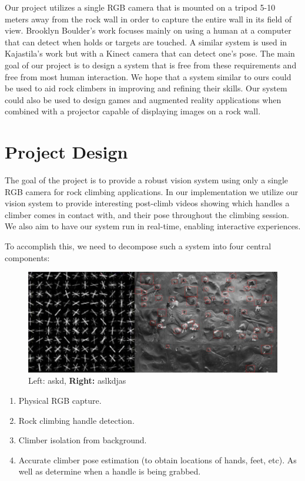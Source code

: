 \documentclass{chi2009}
\begin{document}
Our project utilizes a single RGB camera that is mounted on a tripod 5-10 meters away from the rock wall in order to capture the entire wall in its field of view. Brooklyn Boulder's work focuses mainly on using a human at a computer that can detect when holds or targets are touched. A similar system is used in Kajastila's work but with a Kinect camera that can detect one's pose. The main goal of our project is to design a system that is free from these requirements and free from most human interaction. We hope that a system similar to ours could be used to aid rock climbers in improving and refining their skills. Our system could also be used to design games and augmented reality applications when combined with a projector capable of displaying images on a rock wall.

\section{Project Design}

The goal of the project is to provide a robust vision system using only a single RGB camera for rock climbing applications. In our implementation we utilize our vision system to provide interesting post-climb videos showing which handles a climber comes in contact with, and their pose throughout the climbing session. We also aim to have our system run in real-time, enabling interactive experiences.

To accomplish this, we need to decompose such a system into four central components:

\begin{figure}[t]
  \centering
  \includegraphics[keepaspectratio, width=\textwidth]{figs/svm_wall.jpeg}
  \caption{Left: \normalfont askd, \textbf{Right:} aslkdjas}
  \label{fig:user}
\end{figure}

\begin{enumerate}
  \itemsep0em
  \item Physical RGB capture.
  \item Rock climbing handle detection.
  \item Climber isolation from background.
  \item Accurate climber pose estimation (to obtain locations of hands, feet, etc). As well as determine when a handle is being grabbed.
\end{enumerate}
\end{document}
